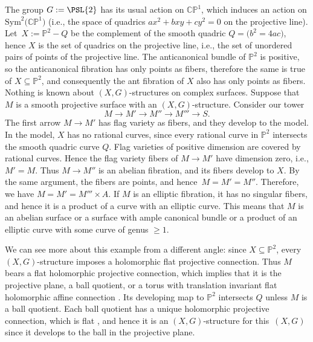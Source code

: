 \documentclass[pdftex]{sigma}
\numberwithin{equation}{section}
\renewcommand{\Proj}[1]{{\mathbb{P}^{#1}}}
\begin{document}
\begin{Example}
The group $G := \PSL{2}$ has its usual action on ${\mathbb C}{\mathbb P}^1$, which induces an action on $\text{Sym}^2\big({\mathbb C}{\mathbb P}^1\big)$
(i.e., the space of quadrics $ax^2+bxy+cy^2 = 0$ on the projective line).
Let~${X := \Proj{2}-Q}$ be the complement of the smooth quadric $Q = \big(b^2 = 4ac\big)$, hence $X$ is the set of quadrics on the projective line, i.e., the set of unordered pairs of points of the projective line.
The anticanonical bundle of $\Proj{2}$ is positive, so the anticanonical fibration has only points as fibers, therefore the same is
true of $X \subseteq \Proj{2}$, and consequently the ant fibration of $X$ also has only points as fibers.
Nothing is known about $(X, G)$-structures on complex surfaces.
Suppose that $M$ is a smooth projective surface with an $(X, G)$-structure.
Consider our tower
\[M \longrightarrow M' \longrightarrow M'' \longrightarrow M''' \longrightarrow S.\]
The first arrow $M \to M'$ has flag variety as fibers, and they develop to the model.
In the model, $X$ has no rational curves, since every rational curve in $\Proj{2}$ intersects the smooth quadric curve $Q$.
Flag varieties of positive dimension are covered by rational curves.
Hence the flag variety fibers of $M \to M'$ have dimension zero, i.e., $M' = M$.
Thus $M \to M''$ is an abelian fibration, and its fibers develop to $X$.
By the same argument, the fibers are points, and hence~${M = M' = M''}$.
Therefore, we have $M = M' = M'''\times A$.
If $M$ is an elliptic fibration, it has no singular fibers, and hence it is a product of a curve with an elliptic curve.
This means that $M$ is an abelian surface or a surface with ample canonical bundle or a product of an elliptic curve with some curve of
genus $ \ge 1$.

We can see more about this example from a different angle: since $X \subseteq \Proj{2}$, every $(X, G)$-structure imposes a
holomorphic flat projective connection. Thus $M$ bears a flat holomorphic projective connection, which
implies that it is the projective plane, a ball
quotient, or a torus with translation invariant flat holomorphic affine connection \cite[Main theorem]{KobayashiOchiai:1980}. Its
developing map to $\Proj{2}$ intersects $Q$ unless $M$ is a ball quotient. Each ball quotient has a unique holomorphic projective
connection, which is flat \cite{McKay:2016}, and hence it is an $(X, G)$-structure for this~$(X, G)$ since it develops to the ball in the
projective plane.
\end{Example}
\end{document}
